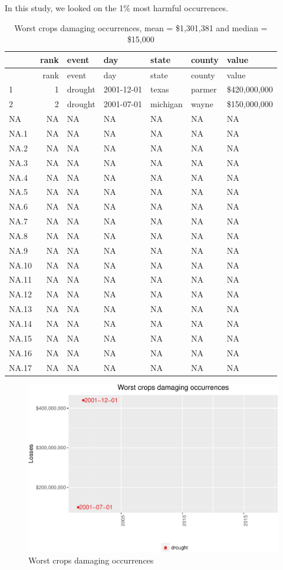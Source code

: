 \documentclass[]{article}
\begin{document}
In this study, we looked on the 1\% most harmful occurrences.

\begin{longtable}[]{@{}lrlllll@{}}
\caption{Worst crops damaging occurrences, mean = \$1,301,381 and median
= \$15,000}\tabularnewline
\toprule
& rank & event & day & state & county & value\tabularnewline
\midrule
\endfirsthead
\toprule
& rank & event & day & state & county & value\tabularnewline
\midrule
\endhead
1 & 1 & drought & 2001-12-01 & texas & parmer &
\$420,000,000\tabularnewline
2 & 2 & drought & 2001-07-01 & michigan & wayne &
\$150,000,000\tabularnewline
NA & NA & NA & NA & NA & NA & NA\tabularnewline
NA.1 & NA & NA & NA & NA & NA & NA\tabularnewline
NA.2 & NA & NA & NA & NA & NA & NA\tabularnewline
NA.3 & NA & NA & NA & NA & NA & NA\tabularnewline
NA.4 & NA & NA & NA & NA & NA & NA\tabularnewline
NA.5 & NA & NA & NA & NA & NA & NA\tabularnewline
NA.6 & NA & NA & NA & NA & NA & NA\tabularnewline
NA.7 & NA & NA & NA & NA & NA & NA\tabularnewline
NA.8 & NA & NA & NA & NA & NA & NA\tabularnewline
NA.9 & NA & NA & NA & NA & NA & NA\tabularnewline
NA.10 & NA & NA & NA & NA & NA & NA\tabularnewline
NA.11 & NA & NA & NA & NA & NA & NA\tabularnewline
NA.12 & NA & NA & NA & NA & NA & NA\tabularnewline
NA.13 & NA & NA & NA & NA & NA & NA\tabularnewline
NA.14 & NA & NA & NA & NA & NA & NA\tabularnewline
NA.15 & NA & NA & NA & NA & NA & NA\tabularnewline
NA.16 & NA & NA & NA & NA & NA & NA\tabularnewline
NA.17 & NA & NA & NA & NA & NA & NA\tabularnewline
\bottomrule
\end{longtable}

\begin{figure}[htbp]
\centering
\includegraphics{readme_files/figure-latex/crop-single-plot-1.pdf}
\caption{Worst crops damaging occurrences}
\end{figure}
\end{document}
